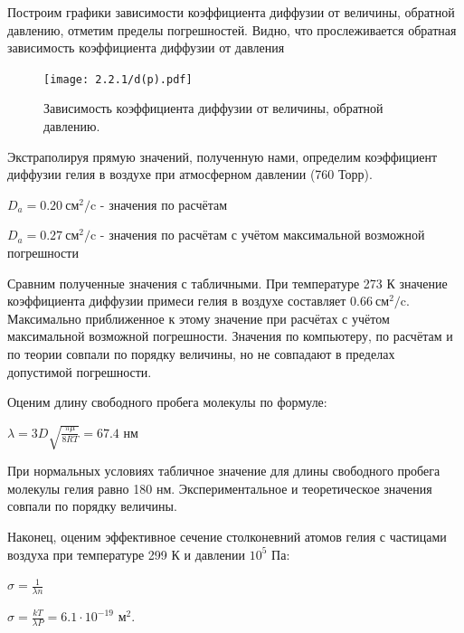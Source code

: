 \documentclass[a4paper,12pt]{article} %
\begin{document}
Построим графики зависимости коэффициента диффузии от величины, обратной давлению, отметим пределы погрешностей. Видно, что прослеживается обратная зависимость коэффициента диффузии от давления
\begin{figure}[H]
    \centering
    \begin{center}
    \caption{Зависимость коэффициента диффузии от величины, обратной давлению.}
    \end{center}
    \texttt{[image: 2.2.1/d(p).pdf]}
    \label{fig:vac}
\end{figure} 

Экстраполируя прямую значений, полученную нами, определим коэффициент диффузии гелия в воздухе при атмосферном давлении (760 Торр).\\
\begin{center}
$\displaystyle D_a = 0.20\ \mbox{см}^2/$c - значения по расчётам \break

$\displaystyle D_a = 0.27\ \mbox{см}^2/$c - значения по расчётам с учётом максимальной возможной погрешности\\
\break

\end{center}

Сравним полученные значения с табличными. При температуре 273 К значение коэффициента диффузии примеси гелия в воздухе составляет $0.66 \ \mbox{см}^2/$c. Максимально приближенное к этому значение при расчётах с учётом максимальной возможной погрешности. Значения по компьютеру, по расчётам и по теории совпали по порядку величины, но не совпадают в пределах допустимой погрешности. 

Оценим длину свободного пробега молекулы по формуле:
\begin{center}
$\displaystyle \lambda = 3D \sqrt{\frac{\pi \mu }{8RT}} = 67.4$ нм
\break

\end{center}
При нормальных условиях табличное значение для длины свободного пробега молекулы гелия равно 180 нм. Экспериментальное и теоретическое значения совпали по порядку величины.

Наконец, оценим эффективное сечение столконевний атомов гелия с частицами воздуха при температуре 299 К и давлении $10^5$ Па:

\begin{center}
$\displaystyle \sigma = \frac{1}{\lambda n}$
\break

$\displaystyle \sigma = \frac{kT}{\lambda P} = 6.1 \cdot 10^{-19}$ м$^2$.
\end{center}
\end{document}
